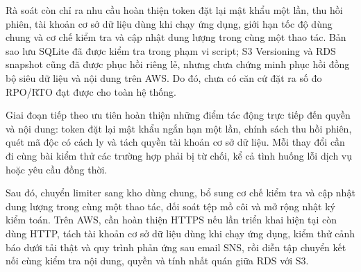 Rà soát còn chỉ ra nhu cầu hoàn thiện token đặt lại mật khẩu một lần, thu hồi phiên, tài khoản cơ sở dữ liệu dùng khi chạy ứng dụng, giới hạn tốc độ dùng chung và cơ chế kiểm tra và cập nhật dung lượng trong cùng một thao tác. Bản sao lưu SQLite đã được kiểm tra trong phạm vi script; S3 Versioning và RDS snapshot cũng đã được phục hồi riêng lẻ, nhưng chưa chứng minh phục hồi đồng bộ siêu dữ liệu và nội dung trên AWS. Do đó, chưa có căn cứ đặt ra số đo RPO/RTO đạt được cho toàn hệ thống.

Giai đoạn tiếp theo ưu tiên hoàn thiện những điểm tác động trực tiếp đến quyền và nội dung: token đặt lại mật khẩu ngắn hạn một lần, chính sách thu hồi phiên, quét mã độc có cách ly và tách quyền tài khoản cơ sở dữ liệu. Mỗi thay đổi cần đi cùng bài kiểm thử các trường hợp phải bị từ chối, kể cả tình huống lỗi dịch vụ hoặc yêu cầu đồng thời.

Sau đó, chuyển limiter sang kho dùng chung, bổ sung cơ chế kiểm tra và cập nhật dung lượng trong cùng một thao tác, đối soát tệp mồ côi và mở rộng nhật ký kiểm toán. Trên AWS, cần hoàn thiện HTTPS nếu lần triển khai hiện tại còn dùng HTTP, tách tài khoản cơ sở dữ liệu dùng khi chạy ứng dụng, kiểm thử cảnh báo dưới tải thật và quy trình phản ứng sau email SNS, rồi diễn tập chuyển kết nối cùng kiểm tra nội dung, quyền và tính nhất quán giữa RDS với S3.

